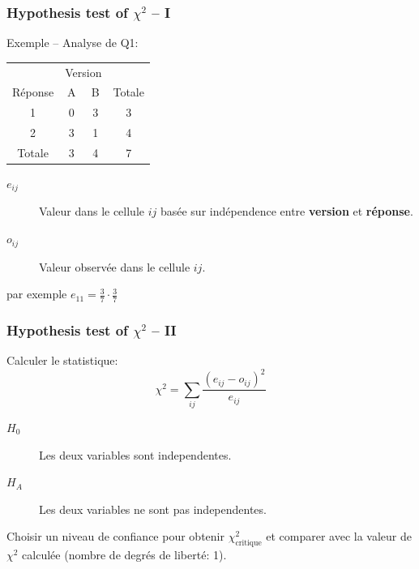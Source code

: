 \documentclass{beamer}
\begin{document}
\begin{frame}
  \frametitle{Hypothesis test of $\chi^2$ -- I}
Exemple -- Analyse de Q1:


\begin{center}
\begin{tabular}{c|cc|c}
   & \multicolumn{2}{c|}{Version} &  \\ 
  Réponse  & A & B & Totale \\ \hline
  1 & 0 & 3 & 3 \\
  2 & 3 & 1 & 4 \\ \hline
  Totale & 3 & 4 & 7
\end{tabular}
\end{center}

\begin{description}
\item [$e_{ij}$] Valeur dans le cellule ${ij}$ basée sur indépendence entre
  {\bf version} et {\bf réponse}.
\item [$o_{ij}$] Valeur observée dans le cellule ${ij}$.
\end{description}

par exemple $e_{11} = \frac{3}{7} \cdot \frac{3}{7}$
\end{frame}

\begin{frame}
\frametitle{Hypothesis test of $\chi^2$ -- II}

Calculer le statistique:
\[
\chi^2 = \sum_{ij} \frac{(e_{ij}-o_{ij})^2}{e_{ij}}
\]

  \begin{description}
  \item[$H_0$] Les deux variables sont independentes. 
  \item[$H_A$] Les deux variables ne sont pas independentes.
  \end{description}

  Choisir un niveau de confiance pour obtenir $\chi^2_{\text{critique}}$ et comparer avec
  la valeur de $\chi^2$ calculée (nombre de degrés de liberté: 1). 
\end{frame}
\end{document}
